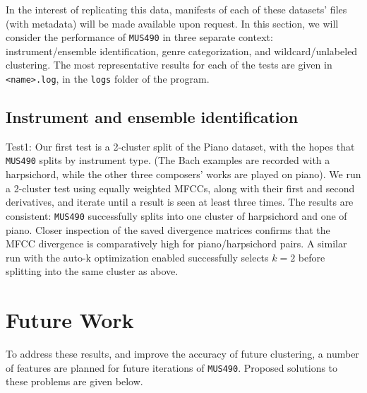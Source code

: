 \documentclass[10pt,twocolumn]{article}
\begin{document}
In the interest of replicating this data, manifests of each of these datasets’ files (with metadata) will be made available upon request. In this section, we will consider the performance of \texttt{MUS490} in three separate context: instrument/ensemble identification, genre categorization, and wildcard/unlabeled clustering. The most representative results for each of the tests are given in \texttt{<name>.log}, in the \texttt{logs} folder of the program.

\subsection{Instrument and ensemble identification}

Test1: Our first test is a 2-cluster split of the Piano dataset, with the hopes that \texttt{MUS490} splits by instrument type. (The Bach examples are recorded with a harpsichord, while the other three composers’ works are played on piano). We run a 2-cluster test using equally weighted MFCCs, along with their first and second derivatives, and iterate until a result is seen at least three times. The results are consistent: \texttt{MUS490} successfully splits into one cluster of harpsichord and one of piano. Closer inspection of the saved divergence matrices confirms that the MFCC divergence is comparatively high for piano/harpsichord pairs. A similar run with the auto-k optimization enabled successfully selects $k = 2$ before splitting into the same cluster as above.


\section{Future Work}
\label{sec:future}

	
To address these results, and improve the accuracy of future clustering, a number of features are planned for future iterations of \texttt{MUS490}. Proposed solutions to these problems are given below.
\end{document}
